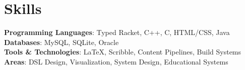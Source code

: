 \documentclass[letterpaper,11pt]{article}
\begin{document}
\section{Skills}
\begin{itemize}[leftmargin=0.15in, label={}]
\small{
\item{
  \textbf{Programming Languages}{: Typed Racket, C++, C, HTML/CSS, Java} \\
  \textbf{Databases}{: MySQL, SQLite, Oracle} \\
  \textbf{Tools \& Technologies}{: LaTeX, Scribble, Content Pipelines, Build Systems} \\
  \textbf{Areas}{: DSL Design, Visualization, System Design, Educational Systems}
}
}
\end{itemize}
\end{document}
